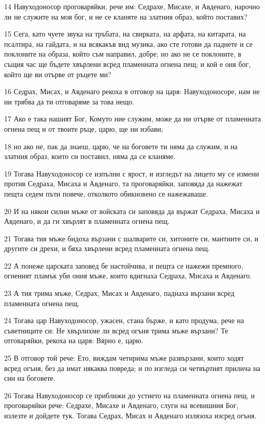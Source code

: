 \par 14 Навуходоносор проговаряйки, рече им: Седрахе, Мисахе, и Авденаго, нарочно ли не служите на моя бог, и не се кланяте на златния образ, който поставих?
\par 15 Сега, като чуете звука на тръбата, на свирката, на арфата, на китарата, на псалтира, на гайдата, и на всякакъв вид музика, ако сте готови да паднете и се поклоните на образа, който съм направил, добре; но ако не се поклоните, в същия час ще бъдете хвърлени всред пламенната огнена пещ; и кой е оня бог, който ще ви отърве от ръцете ми?
\par 16 Седрах, Мисах, и Авденаго рекоха в отговор на царя: Навуходоносоре, нам  не ни трябва да ти отговаряме за това нещо.
\par 17 Ако е така нашият Бог, Комуто ние служим, може да ни отърве от пламенната огнена пещ и от твоите ръце, царю, ще ни избави;
\par 18 но ако не, пак да знаеш, царю, че на боговете ти няма да служим, и на златния образ, които си поставил, няма да се кланяме.
\par 19 Тогава Навуходоносор се изпълни с ярост, и изгледът на лицето му се измени против Седраха, Мисаха и Авденаго, та проговаряйки, заповяда да нажежат пещта седем пъти повече, отколкото обикновено се нажежаваше.
\par 20 И на някои силни мъже от войската си заповяда да вържат Седраха, Мисаха и Авденаго, и да ги хвърлят в пламенната огнена пещ.
\par 21 Тогава тия мъже бидоха вързани с шалварите си, хитоните си, мантиите си, и другите си дрехи, и бяха хвърлени всред пламенната огнена пещ.
\par 22 А понеже царската заповед бе настойчива, и пещта се нажежи премного, огненият пламък уби ония мъже, които вдигнаха Седраха, Мисаха и Авденаго.
\par 23 А тия трима мъже, Седрах, Мисах и Авденаго, паднаха вързани всред пламенната огнена пещ.
\par 24 Тогава цар Навуходоносор, ужасен, стана бърже, и като продума, рече на съветниците си: Не хвърлихме ли всред огъня трима мъже вързани? Те отговаряйки, рекоха на царя: Вярно е, царю.
\par 25 В отговор той рече: Ето, виждам четирима мъже развързани, които ходят всред огъня, без да имат някаква повреда; и по изгледа си четвъртият прилича на син на боговете.
\par 26 Тогава Навуходоносор се приближи до устието на пламенната огнена пещ, и проговаряйки рече: Седрахе, Мисахе и Авденаго, слуги на всевишния Бог, излезте и дойдете тук. Тогава Седрах, Мисах и Авденаго излязоха изсред огъня.

